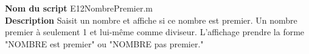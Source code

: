 \textbf{Nom du script}
E12NombrePremier.m\\
\textbf{Description}
Saisit un nombre et affiche si ce nombre est premier. Un nombre premier à seulement 1 et lui-même comme diviseur. L'affichage prendre la forme "NOMBRE est premier" ou "NOMBRE pas premier."